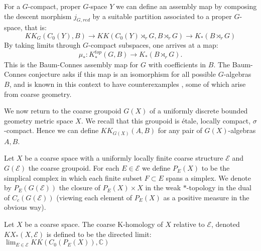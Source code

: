 \begin{conjecture}
{\begin{remark}
For a $G$-compact, proper $G$-space $Y$ we can define an assembly map by composing the descent morphism $j_{G,red}$ by a suitable partition associated to a proper $G$-space, that is:
\begin{equation*}
KK_{G}(C_{0}(Y),B) \rightarrow KK(C_{0}(Y)\rtimes_{r}G, B\rtimes_{r} G) \rightarrow K_{*}(B\rtimes_{r}G)
\end{equation*}
By taking limits through $G$-compact subspaces, one arrives at a map:
\begin{equation*}
\mu_{*}:K^{top}_{*}(G,B)\rightarrow K_{*}(B\rtimes_{r}G).
\end{equation*}
This is the Baum-Connes assembly map for $G$ with coefficients in $B$. The Baum-Connes conjecture asks if this map is an isomorphism for all possible $G$-algebras $B$, and is known in this context to have counterexamples \cite{MR1911663}, some of which arise from coarse geometry.
\end{remark}

We now return to the coarse groupoid $G(X)$ of a uniformly discrete bounded geometry metric space $X$. We recall that this groupoid is \'etale, locally compact, $\sigma$-compact. Hence we can define $KK_{G(X)}(A,B)$ for any pair of $G(X)$-algebras $A,B$. 

\begin{definition}
Let $X$ be a coarse space with a uniformly locally finite coarse structure $\mathcal{E}$ and $G(\mathcal{E})$ the coarse groupoid. For each $E \in \mathcal{E}$ we define $P_{E}(X)$ to be the simplical complex in which each finite subset $F \subset E$ spans a simplex. We denote by $P_{E}(G(\mathcal{E}))$ the closure of $P_{E}(X)\times X$ in the weak $*$-topology in the dual of $C_{c}(G(\mathcal{E}))$ (viewing each element of $P_{E}(X)$ as a positive measure in the obvious way).
\end{definition}

\begin{definition}
Let $X$ be a coarse space. The coarse K-homology of $X$ relative to $\mathcal{E}$, denoted $KX_{*}(X,\mathcal{E})$ is defined to be the directed limit: $\lim_{E \in \mathcal{E}}KK(C_{0}(P_{E}(X)),\mathbb{C})$
\end{definition}

}
\end{conjecture}

